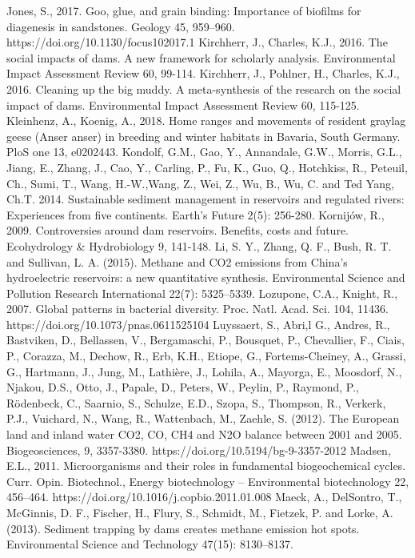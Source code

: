\begin{thebibliography}{}
Jones, S., 2017. Goo, glue, and grain binding: Importance of biofilms for diagenesis in sandstones. Geology 45, 959–960. https://doi.org/10.1130/focus102017.1
Kirchherr, J., Charles, K.J., 2016. The social impacts of dams. A new framework for scholarly analysis. Environmental Impact Assessment Review 60, 99-114.
Kirchherr, J., Pohlner, H., Charles, K.J., 2016. Cleaning up the big muddy. A meta-synthesis of the research on the social impact of dams. Environmental Impact Assessment Review 60, 115-125.
Kleinhenz, A., Koenig, A., 2018. Home ranges and movements of resident graylag geese (Anser anser) in breeding and winter habitats in Bavaria, South Germany. PloS one 13, e0202443.
Kondolf, G.M., Gao, Y., Annandale, G.W., Morris, G.L., Jiang, E.,  Zhang, J., Cao, Y., Carling, P., Fu, K., Guo, Q., Hotchkiss, R.,  Peteuil, Ch., Sumi, T., Wang, H.-W.,Wang, Z., Wei, Z., Wu, B.,  Wu, C. and  Ted Yang, Ch.T. 2014. Sustainable sediment management in reservoirs and regulated rivers: Experiences from five continents. Earth’s Future 2(5): 256-280.
Kornijów, R., 2009. Controversies around dam reservoirs. Benefits, costs and future. Ecohydrology & Hydrobiology 9, 141-148.
Li, S. Y., Zhang, Q. F., Bush, R. T. and Sullivan, L. A. (2015). Methane and CO2 emissions from China's hydroelectric reservoirs: a new quantitative synthesis. Environmental Science and Pollution Research International 22(7): 5325–5339.
Lozupone, C.A., Knight, R., 2007. Global patterns in bacterial diversity. Proc. Natl. Acad. Sci. 104, 11436. https://doi.org/10.1073/pnas.0611525104
Luyssaert, S., Abri,l G., Andres, R., Bastviken, D., Bellassen, V., Bergamaschi, P., Bousquet, P., Chevallier, F., Ciais, P., Corazza, M., Dechow, R., Erb, K.H., Etiope, G., Fortems-Cheiney, A., Grassi, G., Hartmann, J., Jung, M., Lathière, J., Lohila, A., Mayorga, E., Moosdorf, N., Njakou, D.S., Otto, J., Papale, D., Peters, W., Peylin, P., Raymond, P., Rödenbeck, C., Saarnio, S., Schulze, E.D., Szopa, S., Thompson, R., Verkerk, P.J., Vuichard, N., Wang, R., Wattenbach, M., Zaehle, S. (2012). The European land and inland water CO2, CO, CH4 and N2O balance between 2001 and 2005. Biogeosciences, 9, 3357-3380. https://doi.org/10.5194/bg-9-3357-2012
Madsen, E.L., 2011. Microorganisms and their roles in fundamental biogeochemical cycles. Curr. Opin. Biotechnol., Energy biotechnology – Environmental biotechnology 22, 456–464. https://doi.org/10.1016/j.copbio.2011.01.008
Maeck, A., DelSontro, T., McGinnis, D. F., Fischer, H., Flury, S., Schmidt, M., Fietzek, P. and Lorke, A. (2013). Sediment trapping by dams creates methane emission hot spots. Environmental Science and Technology 47(15): 8130–8137.

\end{thebibliography}
